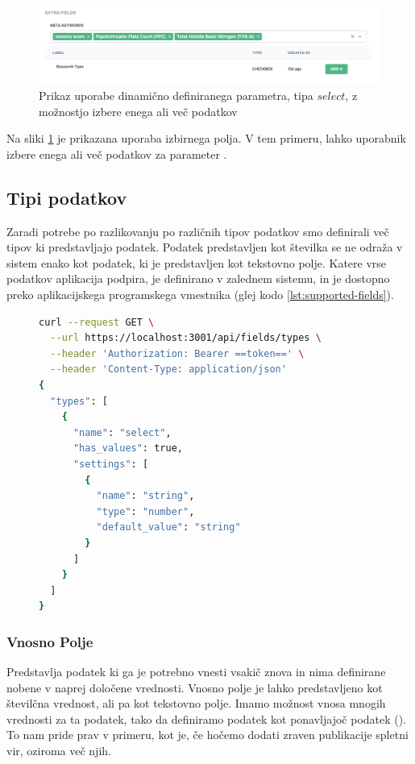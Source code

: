 \documentclass[a4paper, 12pt]{book}
\begin{document}
\begin{figure}[h]
\begin{center}
\includegraphics[width=1\textwidth]{slike/select_example_usage.png}
\end{center}
\caption{ Prikaz uporabe dinamično definiranega parametra, tipa $select$, z možnostjo izbere enega ali več podatkov }
\label{field-usage-example-select}
\end{figure}

Na sliki \ref{field-usage-example-select} je prikazana uporaba izbirnega polja. V tem primeru, lahko uporabnik izbere enega ali več podatkov za parameter . 

\subsection{Tipi podatkov}
Zaradi potrebe po razlikovanju po različnih tipov podatkov smo definirali več tipov ki predstavljajo podatek. Podatek predstavljen kot številka se ne odraža v sistem enako kot podatek, ki je predstavljen kot tekstovno polje. Katere vrse podatkov aplikacija podpira, je definirano v zalednem sistemu, in je dostopno preko aplikacijskega programskega vmestnika (glej kodo \ref{lst:supported-fields}). 

\begin{figure}[h]
    \centering
    \begin{lstlisting}[language=bash, style=mystyle,caption={Izsek aplikacijskega vmestinka za pridobitev vseh podprtih tipov v aplikaciji},label=lst:supported-fields]
curl --request GET \
  --url https://localhost:3001/api/fields/types \
  --header 'Authorization: Bearer ==token==' \
  --header 'Content-Type: application/json'
{
  "types": [
    {
      "name": "select",
      "has_values": true,
      "settings": [
        {
          "name": "string",
          "type": "number",
          "default_value": "string"
        }
      ]
    }
  ]
}
\end{lstlisting}
\end{figure}

\newpage
\subsubsection{Vnosno Polje}
Predstavlja podatek ki ga je potrebno vnesti vsakič znova in nima definirane nobene v naprej določene vrednosti. Vnosno polje je lahko predstavljeno kot številčna vrednost, ali pa kot tekstovno polje. 
Imamo možnost vnosa mnogih vrednosti za ta podatek, tako da definiramo podatek kot ponavljajoč podatek (). To nam pride prav v primeru, kot je, če hočemo dodati zraven publikacije spletni vir, oziroma več njih.
\end{document}

